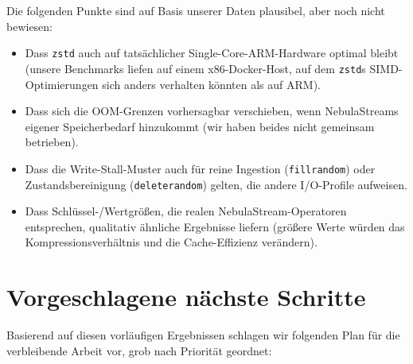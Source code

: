 \documentclass[11pt,a4paper]{scrartcl}
\begin{document}
Die folgenden Punkte sind auf Basis unserer Daten plausibel, aber noch nicht
bewiesen:

\begin{itemize}
  \item Dass \texttt{zstd} auch auf tatsächlicher Single-Core-ARM-Hardware
        optimal bleibt (unsere Benchmarks liefen auf einem x86-Docker-Host, auf
        dem \texttt{zstd}s SIMD-Optimierungen sich anders verhalten könnten als
        auf ARM).
  \item Dass sich die OOM-Grenzen vorhersagbar verschieben, wenn NebulaStreams
        eigener Speicherbedarf hinzukommt (wir haben beides nicht gemeinsam
        betrieben).
  \item Dass die Write-Stall-Muster auch für reine Ingestion
        (\texttt{fillrandom}) oder Zustandsbereinigung (\texttt{deleterandom})
        gelten, die andere I/O-Profile aufweisen.
  \item Dass Schlüssel-/Wertgrößen, die realen NebulaStream-Operatoren
        entsprechen, qualitativ ähnliche Ergebnisse liefern (größere Werte
        würden das Kompressionsverhältnis und die Cache-Effizienz verändern).
\end{itemize}


\section{Vorgeschlagene nächste Schritte}

Basierend auf diesen vorläufigen Ergebnissen schlagen wir folgenden Plan für
die verbleibende Arbeit vor, grob nach Priorität geordnet:
\end{document}
